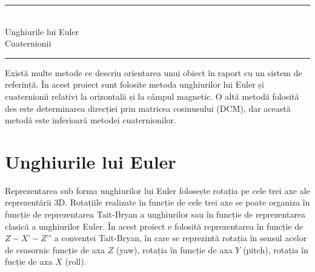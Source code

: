 \noindent\rule{14.7cm}{0.4pt}\\
\-\hspace{1cm}Unghiurile lui Euler\\
\-\hspace{1cm}Cuaternionii\\
\noindent\rule{14.7cm}{0.4pt}
\label{Chapter4} %

%


\fancyhead[R]{\fontsize{12}{12}\selectfont\emph\bfseries\textcolor{black!70}{Automatică şi \\ Informatică Aplicată}}

\-\hspace{1cm}Există multe metode ce descriu orientarea unui obiect  în raport cu un sistem de referință. În acest proiect sunt folosite metoda unghiurilor lui Euler și cuaternionii relativi la orizontală și la câmpul magnetic. O altă metodă folosită des este determinarea direcției prin matricea cosinusului (DCM), dar această metodă este inferioară metodei cuaternionilor.



\section{Unghiurile lui Euler}\label{cap4_1}

\-\hspace{1cm}Reprezentarea sub forma unghiurilor lui Euler folosește rotația pe cele trei axe ale reprezentării 3D. Rotațiile realizate în funcție de cele trei axe se poate organiza în funcție de reprezentarea Tait-Bryan a unghiurilor sau în funcție de reprezentarea clasică a unghiurilor Euler. În acest proiect e folosită reprezentarea în funcție de $Z-X’-Z’'$ a convenței Tait-Bryan, în care se reprezintă rotația în sensul acelor de ceasornic  funcție de axa $Z$ (yaw), rotația în funcție de axa $Y$ (pitch), rotația în fucție de axa $X$ (roll).



